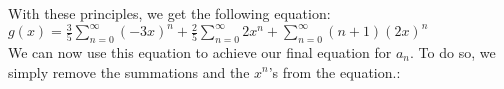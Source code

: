 \begin{solution}
\noindent
With these principles, we get the following equation:\\

$g(x) = \frac{3}{5}\sum_{n = 0}^\infty (-3x)^n + \frac{2}{5}\sum_{n = 0}^\infty 2x^n + \sum_{n = 0}^\infty (n + 1)(2x)^n$\\

\noindent
We can now use this equation to achieve our final equation for $a_n$. To do so, we simply remove the summations and the $x^n$'s from the equation.:\\


\end{solution} \\



